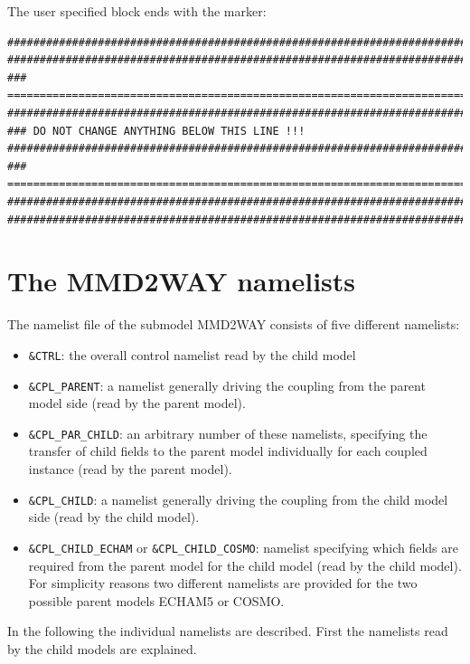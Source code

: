 \documentclass[11pt,twoside]{article}
\begin{document}
The user specified block ends with the marker:
\begin{verbatim}
#############################################################################
#############################################################################
### =========================================================================
#############################################################################
### DO NOT CHANGE ANYTHING BELOW THIS LINE !!!
#############################################################################
### =========================================================================
#############################################################################
#############################################################################
\end{verbatim}

\section{The MMD2WAY namelists}\label{sec:namelist}
The namelist file of the submodel MMD2WAY consists of five different
namelists:
\begin{itemize}
\item \verb|&CTRL|: the overall control namelist read by the child model
\item \verb|&CPL_PARENT|: a namelist generally driving the coupling from the
parent model side (read by the parent model).
\item \verb|&CPL_PAR_CHILD|: an arbitrary number of these namelists,
specifying the transfer of child fields to the parent model individually for
each coupled instance (read by the parent model).
\item \verb|&CPL_CHILD|: a namelist generally driving the coupling from the
child model side (read by the child model).
\item \verb|&CPL_CHILD_ECHAM| or \verb|&CPL_CHILD_COSMO|: namelist specifying
which fields are required from the parent model for the child model (read by
the child model). For simplicity reasons two different namelists are provided
for the two possible parent models ECHAM5 or COSMO.
\end{itemize}

In the following the individual namelists are described.
First the namelists read by the child models are explained.
\end{document}
